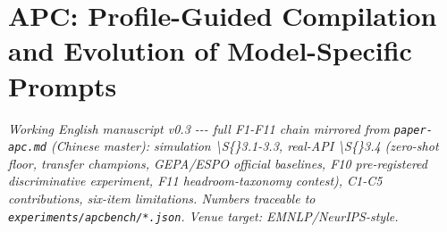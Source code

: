 \section{APC: Profile-Guided Compilation and Evolution of Model-Specific Prompts}\label{apc-profile-guided-compilation-and-evolution-of-model-specific-prompts}

\emph{Working English manuscript v0.3 -\/-\/- full F1-F11 chain mirrored from \texttt{paper-apc.md} (Chinese master): simulation \textbackslash S\{\}3.1-3.3, real-API \textbackslash S\{\}3.4 (zero-shot floor, transfer champions, GEPA/ESPO official baselines, F10 pre-registered discriminative experiment, F11 headroom-taxonomy contest), C1-C5 contributions, six-item limitations. Numbers traceable to \texttt{experiments/apcbench/*.json}. Venue target: EMNLP/NeurIPS-style.}

